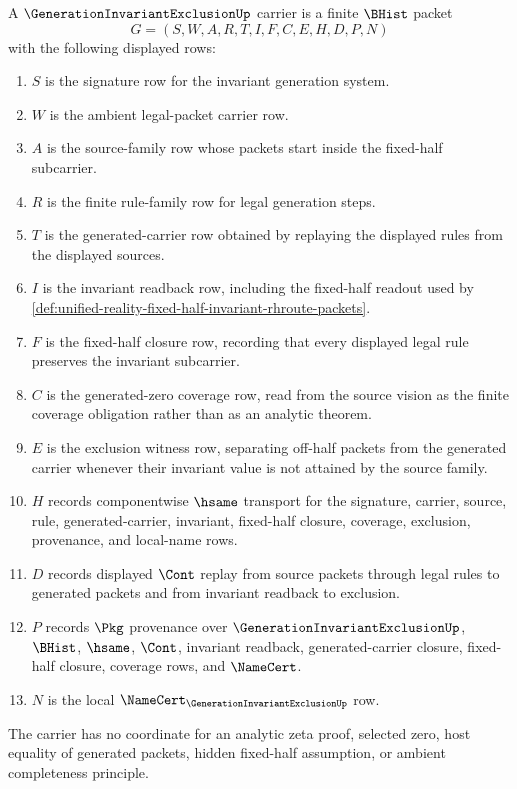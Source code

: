 \begin{definition}
\label{def:generation-invariant-exclusion-packet}
A $\GenerationInvariantExclusionUp$ carrier is a finite $\BHist$ packet
$$
G=(S,W,A,R,T,I,F,C,E,H,D,P,N)
$$
with the following displayed rows:
\begin{enumerate}
\item $S$ is the signature row for the invariant generation system.
\item $W$ is the ambient legal-packet carrier row.
\item $A$ is the source-family row whose packets start inside the fixed-half subcarrier.
\item $R$ is the finite rule-family row for legal generation steps.
\item $T$ is the generated-carrier row obtained by replaying the displayed rules from the displayed sources.
\item $I$ is the invariant readback row, including the fixed-half readout used by \autoref{def:unified-reality-fixed-half-invariant-rhroute-packets}.
\item $F$ is the fixed-half closure row, recording that every displayed legal rule preserves the invariant subcarrier.
\item $C$ is the generated-zero coverage row, read from the source vision as the finite coverage obligation rather than as an analytic theorem.
\item $E$ is the exclusion witness row, separating off-half packets from the generated carrier whenever their invariant value is not attained by the source family.
\item $H$ records componentwise $\hsame$ transport for the signature, carrier, source, rule, generated-carrier, invariant, fixed-half closure, coverage, exclusion, provenance, and local-name rows.
\item $D$ records displayed $\Cont$ replay from source packets through legal rules to generated packets and from invariant readback to exclusion.
\item $P$ records $\Pkg$ provenance over $\GenerationInvariantExclusionUp$, $\BHist$, $\hsame$, $\Cont$, invariant readback, generated-carrier closure, fixed-half closure, coverage rows, and $\NameCert$.
\item $N$ is the local $\NameCert_{\GenerationInvariantExclusionUp}$ row.
\end{enumerate}
The carrier has no coordinate for an analytic zeta proof, selected zero, host equality of generated packets, hidden fixed-half assumption, or ambient completeness principle.
\end{definition}

